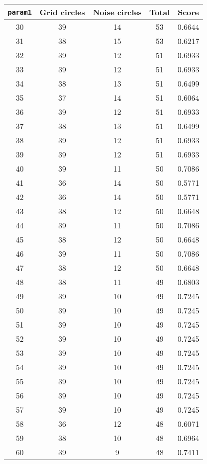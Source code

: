\documentclass[letterpaper, 12pt]{article}
\begin{document}
\begin{longtable}{|c|c|c|c|c|}
\hline
\textbf{\texttt{param1}} & \textbf{Grid circles} & \textbf{Noise circles} & \textbf{Total} & \textbf{Score} \\
\hline
30 & 39 & 14 & 53 & 0.6644 \\
\hline
31 & 38 & 15 & 53 & 0.6217 \\
\hline
32 & 39 & 12 & 51 & 0.6933 \\
\hline
33 & 39 & 12 & 51 & 0.6933 \\
\hline
34 & 38 & 13 & 51 & 0.6499 \\
\hline
35 & 37 & 14 & 51 & 0.6064 \\
\hline
36 & 39 & 12 & 51 & 0.6933 \\
\hline
37 & 38 & 13 & 51 & 0.6499 \\
\hline
38 & 39 & 12 & 51 & 0.6933 \\
\hline
39 & 39 & 12 & 51 & 0.6933 \\
\hline
40 & 39 & 11 & 50 & 0.7086 \\
\hline
41 & 36 & 14 & 50 & 0.5771 \\
\hline
42 & 36 & 14 & 50 & 0.5771 \\
\hline
43 & 38 & 12 & 50 & 0.6648 \\
\hline
44 & 39 & 11 & 50 & 0.7086 \\
\hline
45 & 38 & 12 & 50 & 0.6648 \\
\hline
46 & 39 & 11 & 50 & 0.7086 \\
\hline
47 & 38 & 12 & 50 & 0.6648 \\
\hline
48 & 38 & 11 & 49 & 0.6803 \\
\hline
49 & 39 & 10 & 49 & 0.7245 \\
\hline
50 & 39 & 10 & 49 & 0.7245 \\
\hline
51 & 39 & 10 & 49 & 0.7245 \\
\hline
52 & 39 & 10 & 49 & 0.7245 \\
\hline
53 & 39 & 10 & 49 & 0.7245 \\
\hline
54 & 39 & 10 & 49 & 0.7245 \\
\hline
55 & 39 & 10 & 49 & 0.7245 \\
\hline
56 & 39 & 10 & 49 & 0.7245 \\
\hline
57 & 39 & 10 & 49 & 0.7245 \\
\hline
58 & 36 & 12 & 48 & 0.6071 \\
\hline
59 & 38 & 10 & 48 & 0.6964 \\
\hline
60 & 39 & 9 & 48 & 0.7411 \\

\end{longtable}
\end{document}
